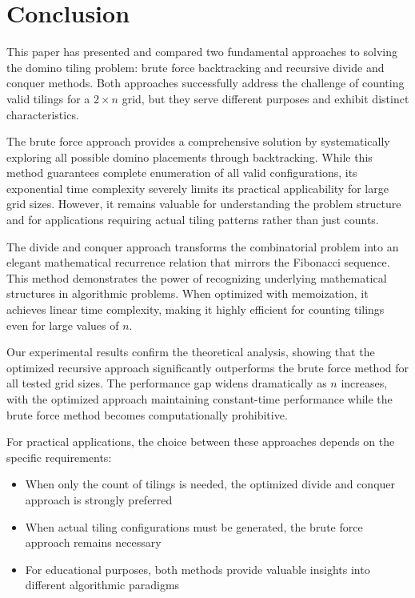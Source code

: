 \documentclass[conference]{IEEEtran}
\begin{document}
\section{Conclusion}

This paper has presented and compared two fundamental approaches to solving the domino tiling problem: brute force backtracking and recursive divide and conquer methods. Both approaches successfully address the challenge of counting valid tilings for a $2 \times n$ grid, but they serve different purposes and exhibit distinct characteristics.

The brute force approach provides a comprehensive solution by systematically exploring all possible domino placements through backtracking. While this method guarantees complete enumeration of all valid configurations, its exponential time complexity severely limits its practical applicability for large grid sizes. However, it remains valuable for understanding the problem structure and for applications requiring actual tiling patterns rather than just counts.

The divide and conquer approach transforms the combinatorial problem into an elegant mathematical recurrence relation that mirrors the Fibonacci sequence. This method demonstrates the power of recognizing underlying mathematical structures in algorithmic problems. When optimized with memoization, it achieves linear time complexity, making it highly efficient for counting tilings even for large values of $n$.

Our experimental results confirm the theoretical analysis, showing that the optimized recursive approach significantly outperforms the brute force method for all tested grid sizes. The performance gap widens dramatically as $n$ increases, with the optimized approach maintaining constant-time performance while the brute force method becomes computationally prohibitive.

For practical applications, the choice between these approaches depends on the specific requirements:
\begin{itemize}
    \item When only the count of tilings is needed, the optimized divide and conquer approach is strongly preferred
    \item When actual tiling configurations must be generated, the brute force approach remains necessary
    \item For educational purposes, both methods provide valuable insights into different algorithmic paradigms
\end{itemize}
\end{document}
